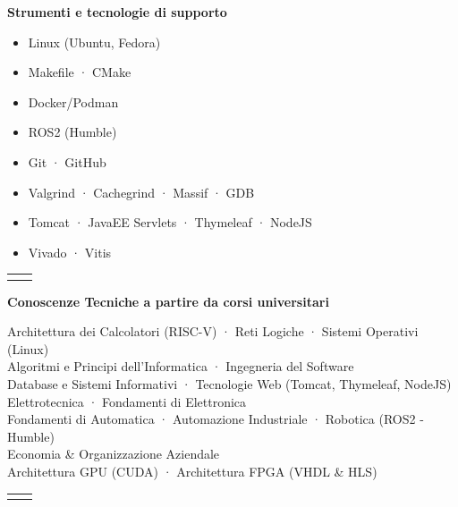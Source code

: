 \documentclass[a4paper, 10pt]{article}
\makeatletter
\newenvironment{cvsubsection}[2]{

    \vspace{0.5cm} \par \noindent
    \begin{minipage}{\textwidth}

        \colorbox{#1}{

            \parbox{\textwidth}{\textbf{#2}}
                        
        }
        \begin{lrbox}{\cvsubbox}

            \begin{minipage}{\dimexpr \textwidth - 0.5em \relax}

}{
    
            \end{minipage}

        \end{lrbox} \par \noindent
        \begin{tabular}{ @{} p{0.5em} | p{\dimexpr \textwidth - 0.5em \relax} @{} }
            
            &   \usebox{\cvsubbox} \\
            
        \end{tabular}
        
    \end{minipage} \par

}
\makeatother
\begin{document}
        \begin{cvsubsection}{blue!20}{Strumenti e tecnologie di supporto}

            \begin{minipage}[t]{0.3\textwidth}
                \begin{itemize}
                    \item Linux (Ubuntu, Fedora)
                    \item Makefile · CMake
                    \item Docker/Podman
                    \item ROS2 (Humble)
                \end{itemize}
            \end{minipage}
            \hspace{1 cm}
            \begin{minipage}[t]{0.525\textwidth}
                \begin{itemize}
                    \item Git · GitHub
                    \item Valgrind · Cachegrind · Massif · GDB
                    \item Tomcat · JavaEE Servlets · Thymeleaf · NodeJS
                    \item Vivado · Vitis
                \end{itemize}
            \end{minipage}

        \end{cvsubsection}
        
        \begin{cvsubsection}{blue!20}{Conoscenze Tecniche a partire da corsi universitari}
            
            Architettura dei Calcolatori (RISC-V) · Reti Logiche · Sistemi Operativi (Linux) \\[0.2 em]
            Algoritmi e Principi dell'Informatica · Ingegneria del Software \\ [0.2 em]
            Database e Sistemi Informativi · Tecnologie Web (Tomcat, Thymeleaf, NodeJS)\\[0.2 em]
            Elettrotecnica · Fondamenti di Elettronica \\[0.4 em]
            Fondamenti di Automatica · Automazione Industriale · Robotica (ROS2 - Humble) \\[0.4 em]
            
            Economia \& Organizzazione Aziendale \\[0.4 em]

            Architettura GPU (CUDA) · Architettura FPGA (VHDL \& HLS) \\[0.2 em]
    
        \end{cvsubsection}
\end{document}
